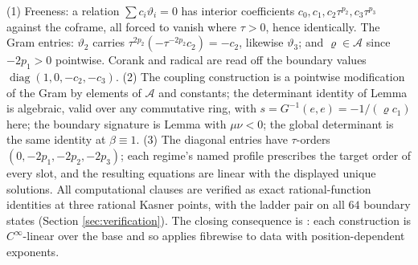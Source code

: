 (1) Freeness: a relation $\sum c_i\vartheta_i = 0$ has interior coefficients $c_0, c_1, c_2\tau^{p_2}, c_3\tau^{p_3}$ against the coframe, all forced to vanish where $\tau > 0$, hence identically. The Gram entries: $\vartheta_2$ carries $\tau^{2p_2}(-\tau^{-2p_2}c_2) = -c_2$, likewise $\vartheta_3$; and $\varrho \in \mathcal{A}$ since $-2p_1 > 0$ pointwise. Corank and radical are read off the boundary values $\operatorname{diag}(1, 0, -c_2, -c_3)$. (2) The coupling construction is a pointwise modification of the Gram by elements of $\mathcal{A}$ and constants; the determinant identity of Lemma  is algebraic, valid over any commutative ring, with $s = G^{-1}(e,e) = -1/(\varrho c_1)$ here; the boundary signature is Lemma  with $\mu\nu < 0$; the global determinant is the same identity at $\beta \equiv 1$. (3) The diagonal entries have $\tau$-orders $(0, -2p_1, -2p_2, -2p_3)$; each regime's named profile prescribes the target order of every slot, and the resulting equations are linear with the displayed unique solutions. All computational clauses are verified as exact rational-function identities at three rational Kasner points, with the ladder pair on all $64$ boundary states (Section \ref{sec:verification}). The closing consequence is : each construction is $C^\infty$-linear over the base and so applies fibrewise to data with position-dependent exponents.
